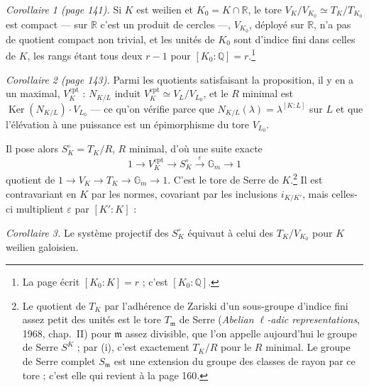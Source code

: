 \documentclass[11pt,a4paper]{article}
\begin{document}
\emph{Corollaire 1 (page 141).} Si $K$ est weilien et $K_{0} = K \cap
\mathbb{R}$, le tore $V_{K}/V_{K_{0}} \simeq T_{K}/T_{K_{0}}$ est compact --- sur
$\mathbb{R}$ c'est un produit de cercles ---, $V_{K_{0}}$, déployé sur
$\mathbb{R}$, n'a pas de quotient compact non trivial, et les unités de $K_{0}$
sont d'indice fini dans celles de $K$, les rangs étant tous deux $r - 1$ pour
$[K_{0} : \mathbb{Q}] = r$.\footnote{La page écrit $[K_{0} : K] = r$ ; c'est
$[K_{0} : \mathbb{Q}]$.}

\emph{Corollaire 2 (page 143).} Parmi les quotients satisfaisant la
proposition, il y en a un maximal, $V_{K}^{\mathrm{cpt}}$ : $N_{K/L}$ induit
$V_{K}^{\mathrm{cpt}} \simeq V_{L}/V_{L_{0}}$, et le $R$ minimal est
$\operatorname{Ker}(N_{K/L}) \cdot V_{L_{0}}$ --- ce qu'on vérifie parce que
$N_{K/L}(\lambda) = \lambda^{[K:L]}$ sur $L$ et que l'élévation à une puissance
est un épimorphisme du tore $V_{L_{0}}$.

Il pose alors $S^{\circ}_{K} = T_{K}/R$, $R$ minimal, d'où une suite exacte
\[
  1 \longrightarrow V_{K}^{\mathrm{cpt}} \longrightarrow S^{\circ}_{K}
  \xrightarrow{\ \varepsilon\ } \mathbb{G}_{m} \longrightarrow 1
\]
quotient de $1 \to V_{K} \to T_{K} \to \mathbb{G}_{m} \to 1$. C'est le tore de
Serre de $K$.\footnote{Le quotient de $T_{K}$ par l'adhérence de Zariski d'un
sous-groupe d'indice fini assez petit des unités est le tore
$T_{\mathfrak{m}}$ de Serre (\emph{Abelian $\ell$-adic representations}, 1968,
chap.\ II) pour $\mathfrak{m}$ assez divisible, que l'on appelle aujourd'hui le
groupe de Serre $S^{K}$ ; par (i), c'est exactement $T_{K}/R$ pour le $R$
minimal. Le groupe de Serre complet $S_{\mathfrak{m}}$ est une extension du groupe
des classes de rayon par ce tore ; c'est elle qui revient à la page 160.} Il est
contravariant en $K$ par les normes, covariant par les inclusions $i_{K/K'}$,
mais celles-ci multiplient $\varepsilon$ par $[K' : K]$ :


\emph{Corollaire 3.} Le système projectif des $S^{\circ}_{K}$ équivaut à celui
des $T_{K}/V_{K_{0}}$ pour $K$ weilien galoisien.
\end{document}
